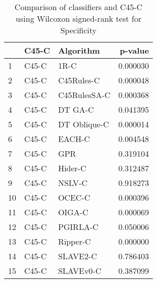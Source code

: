 \begin{table}
\footnotesize
\caption{Comparison of classifiers and C45-C using Wilcoxon signed-rank test for Specificity}
\label{tab:C45-C wilcoxon Specificity comparison}
\begin{tabular}{lllr}
\hline
 & C45-C & Algorithm & p-value \\
\hline
1 & C45-C & 1R-C & 0.000030 \\
2 & C45-C & C45Rules-C & 0.000048 \\
3 & C45-C & C45RulesSA-C & 0.000368 \\
4 & C45-C & DT GA-C & 0.041395 \\
5 & C45-C & DT Oblique-C & 0.000014 \\
6 & C45-C & EACH-C & 0.004548 \\
7 & C45-C & GPR & 0.319104 \\
8 & C45-C & Hider-C & 0.312487 \\
9 & C45-C & NSLV-C & 0.918273 \\
10 & C45-C & OCEC-C & 0.000396 \\
11 & C45-C & OIGA-C & 0.000069 \\
12 & C45-C & PGIRLA-C & 0.050006 \\
13 & C45-C & Ripper-C & 0.000000 \\
14 & C45-C & SLAVE2-C & 0.786403 \\
15 & C45-C & SLAVEv0-C & 0.387099 \\
\hline
\end{tabular}
\end{table}
